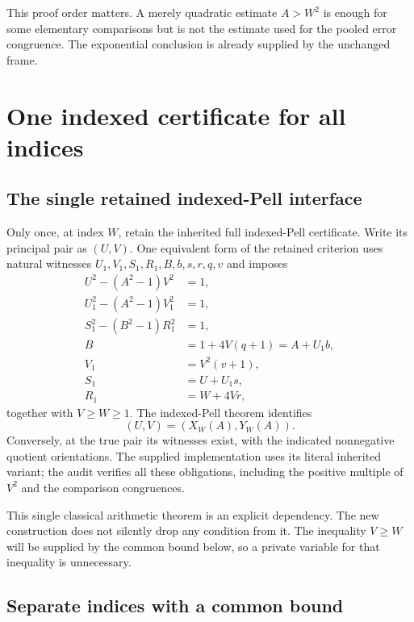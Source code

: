 \documentclass[11pt]{article}
\theoremstyle{definition}\newtheorem{definition}[theorem]{Definition}
\theoremstyle{remark}\newtheorem{remark}[theorem]{Remark}
\begin{document}
This proof order matters. A merely quadratic estimate $A>W^2$ is enough for some elementary comparisons but is not the estimate used for the pooled error congruence. The exponential conclusion is already supplied by the unchanged frame.

\section{One indexed certificate for all indices}

\subsection{The single retained indexed-Pell interface}

Only once, at index $W$, retain the inherited full indexed-Pell certificate. Write its principal pair as $(U,V)$. One equivalent form of the retained criterion uses natural witnesses $U_1,V_1,S_1,R_1,B,b,s,r,q,v$ and imposes
\begin{align}
 U^2-(A^2-1)V^2&=1,\nonumber\\
 U_1^2-(A^2-1)V_1^2&=1,\nonumber\\
 S_1^2-(B^2-1)R_1^2&=1,\nonumber\\
 B&=1+4V(q+1)=A+U_1b,\label{eq:anchor}\\
 V_1&=V^2(v+1),\nonumber\\
 S_1&=U+U_1s,\nonumber\\
 R_1&=W+4Vr,\nonumber
\end{align}
together with $V\ge W\ge1$. The indexed-Pell theorem identifies
\[
 (U,V)=(X_W(A),Y_W(A)).
\]
Conversely, at the true pair its witnesses exist, with the indicated nonnegative quotient orientations. The supplied implementation uses its literal inherited variant; the audit verifies all these obligations, including the positive multiple of $V^2$ and the comparison congruences.

This single classical arithmetic theorem is an explicit dependency. The new construction does not silently drop any condition from it. The inequality $V\ge W$ will be supplied by the common bound below, so a private variable for that inequality is unnecessary.

\subsection{Separate indices with a common bound}
\end{document}
